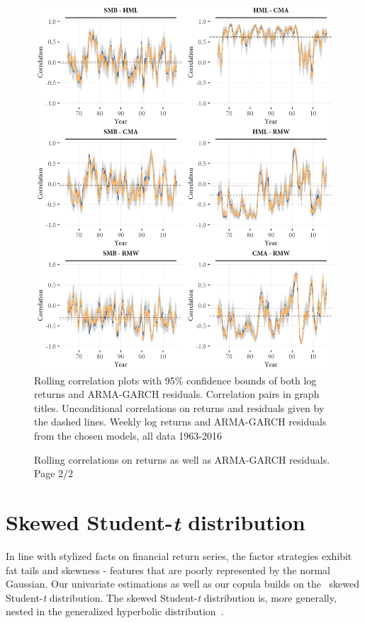 \begin{figure}[H]
  \caption{Rolling correlations on returns as well as ARMA-GARCH residuals. Page 2/2}
  \label{fig:appendix_rolling2}
  \centering
  \begin{minipage}{\textwidth}
  \includegraphics[scale=1]{graphics/appendix_rolling2.png}  
  \vspace{3mm}
  \footnotesize
  Rolling correlation plots with 95\% confidence bounds of both log returns and ARMA-GARCH residuals. Correlation pairs in graph titles. Unconditional correlations on returns and residuals given by the dashed lines. Weekly log returns and ARMA-GARCH residuals from the chosen models, all data 1963-2016
  \end{minipage}
\end{figure}

\newpage

\section{Skewed Student-\textit{t} distribution} 
\label{app:ghstmv}
In line with stylized facts on financial return series, the factor strategies exhibit fat tails and skewness - features that are poorly represented by the normal Gaussian. Our univariate estimations as well as our copula builds on the~\textcite{Hansen1994} skewed Student-\textit{t} distribution. The skewed Student-\textit{t} distribution is, more generally, nested in the generalized hyperbolic distribution~\autocite{McNeilFreyEmbrecht2005}.


